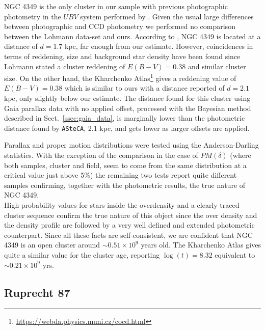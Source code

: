 \documentclass[draft]{aa}
\begin{document}
NGC 4349 is the only cluster in our sample with previous photographic photometry
in the $UBV$ system performed by \cite{Lohmann_1961}. Given the usual large
differences between photographic and CCD photometry we performed no comparison
between the Lohmann data-set and ours. According to \cite{Lohmann_1961}, NGC
4349 is located at a distance of $d=1.7$ kpc, far enough from our estimate.
However, coincidences in terms of reddening, size and background star density
have been found since Lohmann stated a cluster reddening of $E(B-V)=0.38$
and similar cluster size. On the other hand, the Kharchenko
Atlas\footnote{\url{https://webda.physics.muni.cz/cocd.html}}
\citep{Kharchenko_2005} gives a reddening value of $E(B-V)=0.38$ which is
similar to ours with a distance reported of $d=2.1$ kpc, only slightly below
our estimate.
The distance found for this cluster using Gaia parallax data with no applied
offset, processed with the Bayesian method described in
Sect.~\ref{ssec:gaia_data}, is marginally lower than the photometric distance
found by \texttt{ASteCA}, 2.1 kpc, and gets lower as larger offsets are
applied.

Parallax and proper motion distributions were tested using the Anderson-Darling
statistics. With the exception of the comparison in the case of $PM(\delta)$
(where both samples, cluster and field, seem to come from the same distribution
at a critical value just above 5\%) the remaining two tests report quite
different samples confirming, together with the photometric results, the true
nature of NGC 4349.\\

High probability values for stars inside the overdensity and a clearly traced
cluster sequence confirm the true nature of this object since the over density
and the density profile are followed by a very well defined and extended
photometric counterpart.
Since all these facts are self-consistent, we are confident that NGC 4349 is
an open cluster around $\sim0.51\times10^9$ years old.
The Kharchenko Atlas gives quite a similar value for the cluster age, reporting
$\log(t)=8.32$ equivalent to $\sim0.21\times10^9$ yrs.



\subsection{Ruprecht 87}
\end{document}
